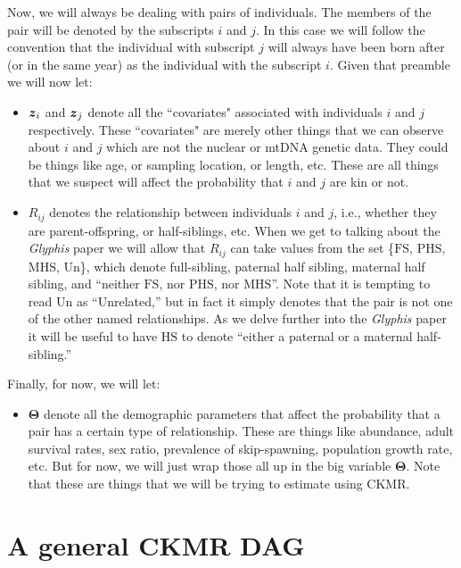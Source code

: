 \documentclass[11pt, oneside]{article}   	%
\def\bm#1{\mathpalette\bmstyle{#1}}
\def\bmstyle#1#2{\mbox{\boldmath$#1#2$}}
\newcommand{\PHS}{\mathrm{PHS}}
\newcommand{\MHS}{\mathrm{MHS}}
\newcommand{\HS}{\mathrm{HS}}
\newcommand{\FS}{\mathrm{FS}}
\newcommand{\Un}{\mathrm{Un}}
\newcommand{\bT}{\mathbf{\Theta}}
\begin{document}
Now, we will always be dealing with pairs of individuals.  The members of the pair will be denoted by 
the subscripts $i$ and $j$.  In this case we will follow the convention that the individual with subscript $j$
will always have been born after (or in the same year) as the individual with the subscript $i$. Given that
preamble we will now let:
\begin{itemize}
\item $\bm{z}_i$ and $\bm{z}_j$ denote all the ``covariates" associated with individuals $i$ and $j$ respectively.
These ``covariates" are merely other things that we can observe about $i$ and $j$ which are not the nuclear or
mtDNA genetic data.  They could be things like age, or sampling location, or length, etc. These are all things
that we suspect will affect the probability that $i$ and $j$ are kin or not.
\item $R_{ij}$ denotes the relationship between individuals $i$ and $j$, i.e., whether they are parent-offspring, or half-siblings, etc.  When we get to talking about the {\em Glyphis} paper we will allow that $R_{ij}$ can take values from
the set \{$\FS$, $\PHS$, $\MHS$, $\Un$\}, which denote full-sibling, paternal half sibling, maternal half sibling, and
``neither $\FS$, nor $\PHS$, nor $\MHS$''.  Note that it is tempting to read $\Un$ as ``Unrelated,'' but in fact it simply
denotes that the pair is not one of the other named relationships.  As we delve further into the {\em Glyphis} paper it
will be useful to have $\HS$ to denote ``either a paternal or a maternal half-sibling.''
\end{itemize}

Finally, for now, we will let:
\begin{itemize}
\item $\bT$ denote all the demographic parameters that affect the probability that a pair has a certain
type of relationship.  These are things like abundance, adult survival rates, sex ratio, prevalence of skip-spawning,
population growth rate, etc.  But for now, we will just wrap those all up in the big variable $\bT$.  Note that these
are things that we will be trying to estimate using CKMR.
\end{itemize}


\section{A general CKMR DAG}
\end{document}
